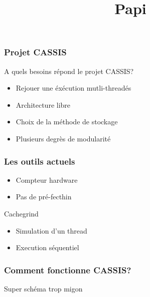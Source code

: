 \begin{frame}
  \frametitle{Projet CASSIS}
  A quels besoins répond le projet CASSIS?
  \newline
  \begin{itemize}  
  \item Rejouer une éxécution mutli-threadés
    \newline
  \item Architecture libre
    \newline
  \item Choix de la méthode de stockage
    \newline
  \item Plusieurs degrès de modularité
  \end{itemize}  
\end{frame}


\begin{frame}
  \frametitle{Les outils actuels}
  \begin{block}{\title{Papi}}
  \begin{itemize}
    \item Compteur hardware
    \item Pas de pré-fecthin
    \end{itemize}    
  \end{block}
  \begin{block}{Cachegrind}
    \begin{itemize}
    \item Simulation d'un thread
    \item Execution séquentiel
    \end{itemize}
  \end{block}   
\end{frame}


\begin{frame}
  \frametitle{Comment fonctionne CASSIS?}
  Super schéma trop migon
\end{frame}
